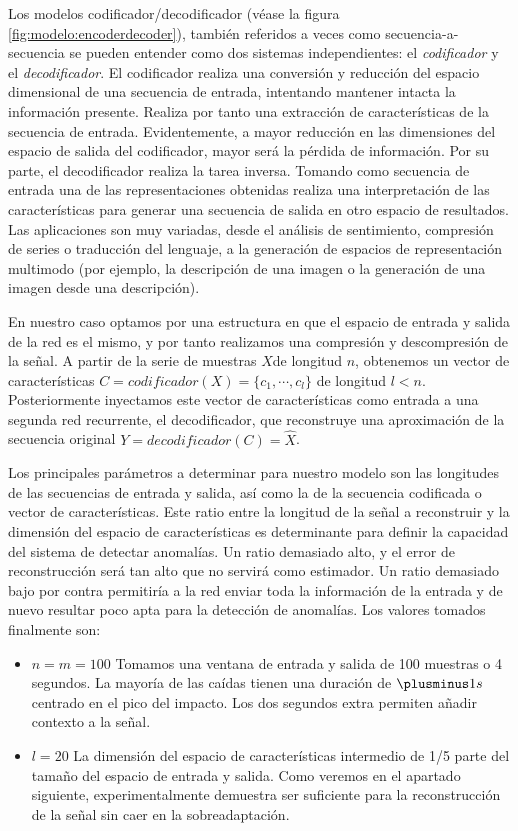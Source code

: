 Los modelos codificador/decodificador (véase la figura \ref{fig:modelo:encoderdecoder}), también referidos a veces como secuencia-a-secuencia se pueden entender como dos sistemas independientes: el \textit{codificador} y el \textit{decodificador}. El codificador realiza una conversión y reducción del espacio dimensional de una secuencia de entrada, intentando mantener intacta la información presente. Realiza por tanto una extracción de características de la secuencia de entrada. Evidentemente, a mayor reducción en las dimensiones del espacio de salida del codificador, mayor será la pérdida de información. Por su parte, el decodificador realiza la tarea inversa. Tomando como secuencia de entrada una de las representaciones obtenidas realiza una interpretación de las características para generar una secuencia de salida en otro espacio de resultados. Las aplicaciones son muy variadas, desde el análisis de sentimiento, compresión de series o traducción del lenguaje, a la generación de espacios de representación multimodo (por ejemplo, la descripción de una imagen o la generación de una imagen desde una descripción). 

En nuestro caso optamos por una estructura en que el espacio de entrada y salida de la red es el mismo, y por tanto realizamos una compresión y descompresión de la señal. A partir de la serie de muestras $X$de longitud $n$, obtenemos un vector de características $C=codificador(X)=\{c_1,\cdots,c_l\}$ de longitud $l<n$. Posteriormente inyectamos este vector de características como entrada a una segunda red recurrente, el decodificador, que reconstruye una aproximación de la secuencia original $Y=decodificador(C)=\hat{X}$.


Los principales parámetros a determinar para nuestro modelo son las longitudes de las secuencias de entrada y salida, así como la de la secuencia codificada o vector de características. Este ratio entre la longitud de la señal a reconstruir y la dimensión del espacio de características es determinante para definir la capacidad del sistema de detectar anomalías. Un ratio demasiado alto, y el error de reconstrucción será tan alto que no servirá como estimador. Un ratio demasiado bajo por contra permitiría a la red enviar toda la información de la entrada y de nuevo resultar poco apta para la detección de anomalías. Los valores tomados finalmente son:
\begin{itemize}
  \item $n=m=100$ Tomamos una ventana de entrada y salida de 100 muestras o 4 segundos. La mayoría de las caídas tienen una duración de $\plusminus1s$ centrado en el pico del impacto. Los dos segundos extra permiten añadir contexto a la señal.
  \item $l=20$ La dimensión del espacio de características intermedio de 1/5 parte del tamaño del espacio de entrada y salida. Como veremos en el apartado siguiente, experimentalmente demuestra ser suficiente para la reconstrucción de la señal sin caer en la sobreadaptación.
\end{itemize}

